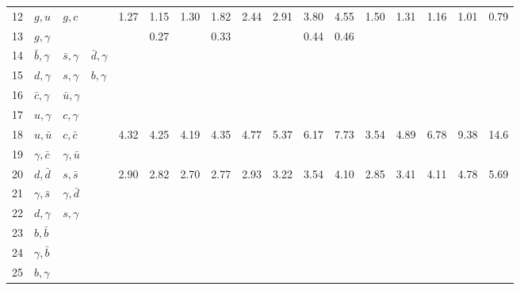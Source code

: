 \begin{tabularx}{\textwidth}{rXXX@{}S@{}S@{}S@{}S@{}S@{}S@{}S@{}S@{}S@{}S@{}S@{}S@{}S}
  12 & $g, u$          & $g, c$          &                 & 1.27 & 1.15 & 1.30 & 1.82 & 2.44 & 2.91 & 3.80 & 4.55 & 1.50 & 1.31 & 1.16 & 1.01 & 0.79 \\
  13 & $g,\gamma$      &                 &                 &      & 0.27 &      & 0.33 &      &      & 0.44 & 0.46 &      &      &      &      &      \\
  14 & $\bar b,\gamma$ & $\bar s,\gamma$ & $\bar d,\gamma$ &      &      &      &      &      &      &      &      &      &      &      &      &      \\
  15 & $d,\gamma$      & $s,\gamma$      & $b,\gamma$      &      &      &      &      &      &      &      &      &      &      &      &      &      \\
  16 & $\bar c,\gamma$ & $\bar u,\gamma$ &                 &      &      &      &      &      &      &      &      &      &      &      &      &      \\
  17 & $u,\gamma$      & $c,\gamma$      &                 &      &      &      &      &      &      &      &      &      &      &      &      &      \\
  18 & $u,\bar u$      & $c,\bar c$      &                 & 4.32 & 4.25 & 4.19 & 4.35 & 4.77 & 5.37 & 6.17 & 7.73 & 3.54 & 4.89 & 6.78 & 9.38 & 14.6 \\
  19 & $\gamma,\bar c$ & $\gamma,\bar u$ &                 &      &      &      &      &      &      &      &      &      &      &      &      &      \\
  20 & $d,\bar d$     & $s,\bar s$      &                 & 2.90 & 2.82 & 2.70 & 2.77 & 2.93 & 3.22 & 3.54 & 4.10 & 2.85 & 3.41 & 4.11 & 4.78 & 5.69 \\
  21 & $\gamma,\bar s$ & $\gamma,\bar d$ &                 &      &      &      &      &      &      &      &      &      &      &      &      &      \\
  22 & $d,\gamma$      & $s,\gamma$      &                 &      &      &      &      &      &      &      &      &      &      &      &      &      \\
  23 & $b,\bar b$      &                 &                 &      &      &      &      &      &      &      &      &      &      &      &      &      \\
  24 & $\gamma,\bar b$ &                 &                 &      &      &      &      &      &      &      &      &      &      &      &      &      \\
  25 & $b,\gamma$      &                 &                 &      &      &      &      &      &      &      &      &      &      &      &      &      \\

\end{tabularx}

